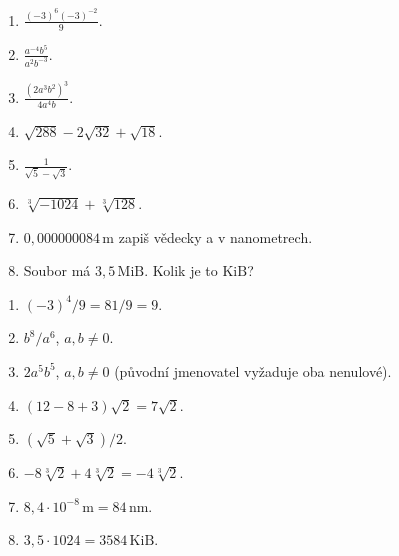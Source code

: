 \documentclass[11pt,a4paper]{article}
\begin{document}
\begin{zadaniReseniBox}[title={Domácí úkol},breakable=false]
\begin{enumerate}[label=\alph*)]
\item $\displaystyle\frac{(-3)^6(-3)^{-2}}{9}$.
\item $\displaystyle\frac{a^{-4}b^5}{a^2b^{-3}}$.
\item $\displaystyle\frac{(2a^3b^2)^3}{4a^4b}$.
\item $\sqrt{288}-2\sqrt{32}+\sqrt{18}$.
\item $\displaystyle\frac1{\sqrt5-\sqrt3}$.
\item $\sqrt[3]{-1024}+\sqrt[3]{128}$.
\item $0{,}000000084\,\mathrm m$ zapiš vědecky a v nanometrech.
\item Soubor má $3{,}5\,\mathrm{MiB}$. Kolik je to $\mathrm{KiB}$?
\end{enumerate}
\tcblower
\begin{enumerate}[label=\alph*)]
\item $(-3)^4/9=81/9=\boxed9$.
\item $\boxed{b^8/a^6}$, $a,b\ne0$.
\item $\boxed{2a^5b^5}$, $a,b\ne0$ (původní jmenovatel vyžaduje oba nenulové).
\item $(12-8+3)\sqrt2=\boxed{7\sqrt2}$.
\item $\boxed{(\sqrt5+\sqrt3)/2}$.
\item $-8\sqrt[3]2+4\sqrt[3]2=\boxed{-4\sqrt[3]2}$.
\item $\boxed{8{,}4\cdot10^{-8}\,\mathrm m=84\,\mathrm{nm}}$.
\item $3{,}5\cdot1024=\boxed{3584\,\mathrm{KiB}}$.
\end{enumerate}
\end{zadaniReseniBox}

\end{document}
